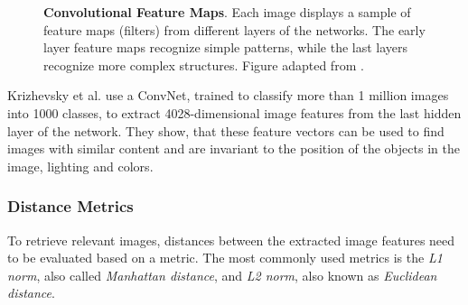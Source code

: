 \documentclass{article}
\begin{document}
\begin{figure}[h]
\centering
{}\hspace{.3cm}
\hspace{.3cm}
\caption{\label{fig:conv_feats} \textbf{Convolutional Feature Maps}. Each image displays a sample of feature maps (filters) from different layers of the networks. The early layer feature maps recognize simple patterns, while the last layers recognize more complex structures. Figure adapted from \cite{gandhi_build_2018}.}
\end{figure}


Krizhevsky et al. \cite{NIPS2012_4824} use a ConvNet, trained to classify more than 1 million images into 1000 classes, to extract 4028-dimensional image features from the last hidden layer of the network. They show, that these feature vectors can be used to find images with similar content and are invariant to the position of the objects in the image, lighting and colors.


\pagebreak
\subsubsection{Distance Metrics}
To retrieve relevant images, distances between the extracted image features need to be evaluated based on a metric. The most commonly used metrics is the \textit{L1 norm}, also called \textit{Manhattan distance}, and \textit{L2 norm}, also known as \textit{Euclidean distance}.
\end{document}
